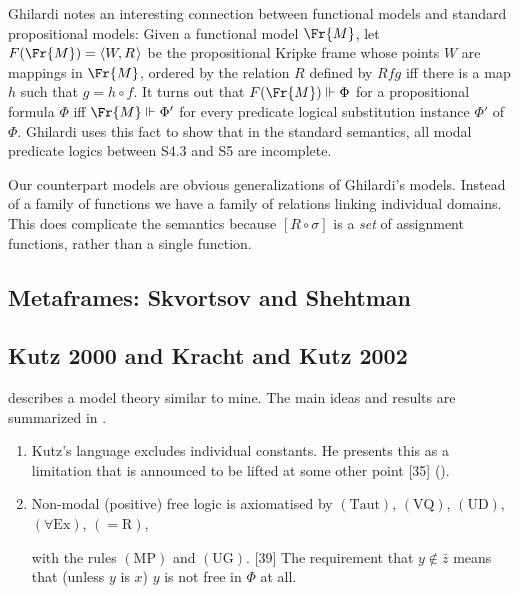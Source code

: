 \documentclass[11pt]{woarticle}
\theoremstyle{break}
\theoremstyle{nonumberplain}
\newcommand{\SAT}{\Vdash}
\newcommand{\1}{\;\,|\;\,}
\renewcommand{\t}[1]{\ensuremath{\langle #1  \makebox[.2ex]{}\rangle}}
\newcommand{\T}[1]{\ensuremath{(\mathrm{ #1})}}
\newcommand{\itemT}[1]{\item[\T{#1}]}
\begin{document}
{Ghilardi notes an interesting connection between functional models and
standard propositional models: Given a functional model $\Fr{M}$, let
$F(\Fr{M}) = \t{W,R}$ be the propositional Kripke frame whose points
$W$ are mappings in $\Fr{M}$, ordered by the relation $R$ defined by
$Rfg$ iff there is a map $h$ such that $g = h \circ f$. It turns out
that $F(\Fr{M}) \SAT \Phi$ for a propositional formula $\Phi$ iff
$\Fr{M} \SAT \Phi'$ for every predicate logical substitution instance
$\Phi'$ of $\Phi$. Ghilardi uses this fact to show that in the
standard semantics, all modal predicate logics between S4.3 and S5 are
incomplete.


Our counterpart models are obvious generalizations of Ghilardi's
models. Instead of a family of functions we have a family of relations
linking individual domains. This does complicate the semantics because
$[R \circ \sigma]$ is a \emph{set} of assignment functions, rather
than a single function.

\subsection{Metaframes: Skvortsov and Shehtman}




\subsection{Kutz 2000 and Kracht and Kutz 2002}

\cite{kutz00kripke} describes a model theory similar to mine. The main
ideas and results are summarized in \cite{kracht02semantics}.

\begin{enumerate}

\item Kutz's language excludes individual constants. He presents this
  as a limitation that is announced to be lifted at some other point
  [35] ().

\item Non-modal (positive) free logic is axiomatised by \T{Taut},
  \T{VQ}, \T{UD}, \T{\forall Ex}, \T{=\!R},
  with the rules \T{MP} and \T{UG}. [39] The requirement that
  $y\not\in \bar{z}$ means that (unless $y$ is $x$) $y$ is not free in
  $\Phi$ at all.


\end{enumerate}}
\end{document}
